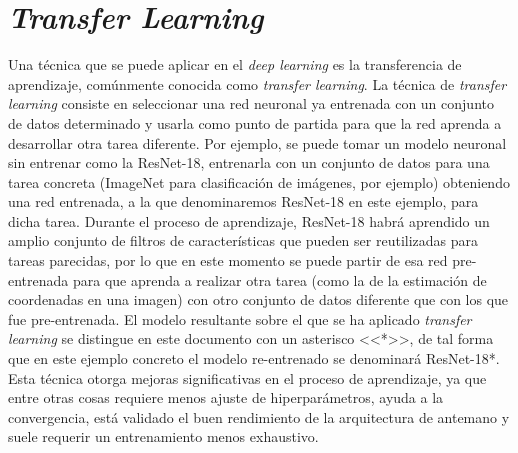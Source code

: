 \section{\textit{Transfer Learning}}
\label{sec:transfer}

Una técnica que se puede aplicar en el \textit{deep learning} es la transferencia de aprendizaje, comúnmente conocida como \textit{transfer learning}. La técnica de \textit{transfer learning} consiste en seleccionar una red neuronal ya entrenada con un conjunto de datos determinado y usarla como punto de partida para que la red aprenda a desarrollar otra tarea diferente. Por ejemplo, se puede tomar un modelo neuronal sin entrenar como la ResNet-18, entrenarla con un conjunto de datos para una tarea concreta (ImageNet para clasificación de imágenes, por ejemplo) obteniendo una red entrenada, a la que denominaremos ResNet-18 en este ejemplo, para dicha tarea. Durante el proceso de aprendizaje, ResNet-18 habrá aprendido un amplio conjunto de filtros de características que pueden ser reutilizadas para tareas parecidas, por lo que en este momento se puede partir de esa red pre-entrenada para que aprenda a realizar otra tarea (como la de la estimación de coordenadas en una imagen) con otro conjunto de datos diferente que con los que fue pre-entrenada. El modelo resultante sobre el que se ha aplicado \textit{transfer learning} se distingue en este documento con un asterisco <<*>>, de tal forma que en este ejemplo concreto el modelo re-entrenado se denominará ResNet-18*. Esta técnica otorga mejoras significativas en el proceso de aprendizaje, ya que entre otras cosas requiere menos ajuste de hiperparámetros, ayuda a la convergencia, está validado el buen rendimiento de la arquitectura de antemano y suele requerir un entrenamiento menos exhaustivo.

